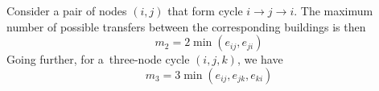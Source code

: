 \documentclass[paper=a4,parskip=half,DIV=12]{leetcode}
\begin{document}
Consider a pair of nodes $(i, j)$ that form cycle $i \to j \to i$. The maximum
number of possible transfers between the corresponding buildings is then
\begin{equation}
  m_2 = 2 \min{(e_{ij}, e_{ji})}
  \label{eq:FMMLO}
\end{equation}
Going further, for a~three-node cycle $(i, j, k)$, we have
\begin{equation}
  m_3 = 3 \min{(e_{ij}, e_{jk}, e_{ki})}
  \label{eq:FMMLO}
\end{equation}




\end{document}
